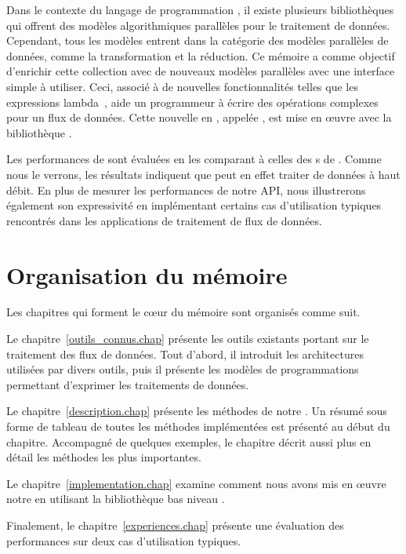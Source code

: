 \begin{introduction}
Dans le contexte du langage de programmation , il existe plusieurs biblioth\`eques qui offrent des mod\`eles algorithmiques parall\`eles pour le traitement de donn\'ees. Cependant, tous les mod\`eles entrent dans la cat\'egorie des mod\`eles parall\`eles de donn\'ees, comme la transformation et la r\'eduction. Ce m\'emoire a comme objectif d'enrichir cette collection avec de nouveaux mod\`eles parall\`eles avec une interface simple \`a utiliser. Ceci, associ\'e \`a de nouvelles fonctionnalit\'es telles que les expressions lambda~\citep{josuttis2012c++}, aide un programmeur \`a \'ecrire des op\'erations complexes pour un flux de donn\'ees. Cette nouvelle  en , appel\'ee ,  est mise en \oe{}uvre avec la biblioth\`eque .

Les performances de  sont \'evalu\'ees en les comparant \`a celles des s de . Comme nous le verrons, les r\'esultats indiquent que  peut en effet traiter de donn\'ees \`a haut d\'ebit. En plus de mesurer les performances de notre API, nous illustrerons \'egalement son expressivit\'e en impl\'ementant certains cas d'utilisation typiques rencontr\'es dans les applications de traitement de flux de donn\'ees.


\section*{Organisation du m\'emoire}

Les chapitres qui forment le c\oe{}ur du m\'emoire sont organis\'es
comme suit.



Le chapitre~\ref{outils_connus.chap}  pr\'esente les outils existants portant sur le traitement des flux de donn\'ees.  Tout d'abord, il introduit les architectures utilis\'ees par divers outils, puis il pr\'esente les mod\`eles de programmations permettant d'exprimer les traitements de donn\'ees.

Le chapitre~\ref{description.chap}  pr\'esente les m\'ethodes de notre . Un r\'esum\'e sous forme de tableau de toutes les m\'ethodes implément\'ees est pr\'esent\'e au d\'ebut du chapitre. Accompagn\'e de quelques exemples, le chapitre d\'ecrit aussi plus en d\'etail les m\'ethodes les plus importantes.

Le chapitre~\ref{implementation.chap}  examine comment nous avons mis en œuvre notre  en utilisant la biblioth\`eque bas niveau .

Finalement, le chapitre~\ref{experiences.chap}  pr\'esente une \'evaluation des performances sur deux cas d'utilisation typiques.

\end{introduction}

